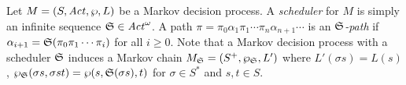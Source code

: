 Let $M = (S, \mathit{Act}, \wp, L)$ be a Markov decision process. A
\emph{scheduler} for $M$ is simply an infinite sequence  $\mathfrak{S}\in \mathit{Act}^\omega$.
A path $\pi =
\pi_0 \alpha_1 \pi_1 \cdots \pi_n \alpha_{n+1} \cdots$ is an
\emph{$\mathfrak{S}$-path} if $\alpha_{i+1} = \mathfrak{S}(\pi_0
\pi_1 \cdots \pi_i)$ for all $i \geq 0$.
Note that a Markov decision process with a
scheduler $\mathfrak{S}$ induces a Markov chain $M_{\mathfrak{S}} =
(S^+, \wp_{\mathfrak{S}}, L')$ where $L' (\sigma s) = L (s)$,
$\wp_{\mathfrak{S}} (\sigma s, \sigma s t) = \wp (s,
\mathfrak{S}(\sigma s), t)$ for $\sigma \in S^*$ and $s, t \in S$.

